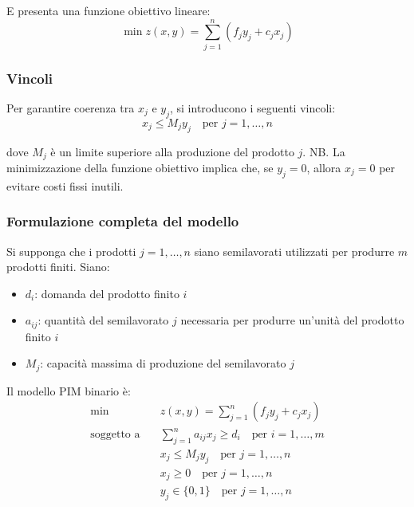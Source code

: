 E presenta una funzione obiettivo lineare:
\[
\min z(x, y) = \sum_{j=1}^{n} (f_j y_j + c_j x_j)
\]

\subsubsection{Vincoli}
Per garantire coerenza tra $x_j$ e $y_j$, si introducono i seguenti vincoli:
\[
x_j \leq M_j y_j \quad \text{per } j = 1, \dots, n
\]

dove $M_j$ è un limite superiore alla produzione del prodotto $j$.
NB. La minimizzazione della funzione obiettivo implica che, se $y_j = 0$, allora $x_j = 0$ 
per evitare costi fissi inutili.

\subsubsection{Formulazione completa del modello}
Si supponga che i prodotti $j=1, \ldots, n$ siano semilavorati utilizzati per produrre 
$m$ prodotti finiti. Siano:
\begin{itemize}
    \item $d_i$: domanda del prodotto finito $i$
    \item $a_{ij}$: quantità del semilavorato $j$ necessaria per produrre un'unità del prodotto finito $i$
    \item $M_j$: capacità massima di produzione del semilavorato $j$
\end{itemize}

Il modello PIM binario è:
\[
\begin{aligned}
\min \quad & z(x, y) = \sum_{j=1}^{n} (f_j y_j + c_j x_j) \\
\text{soggetto a} \quad & \sum_{j=1}^{n} a_{ij} x_j \geq d_i \quad \text{per } i = 1, \dots, m \\
& x_j \leq M_j y_j \quad \text{per } j = 1, \dots, n \\
& x_j \geq 0 \quad \text{per } j = 1, \dots, n \\
& y_j \in \{0, 1\} \quad \text{per } j = 1, \dots, n
\end{aligned}
\]